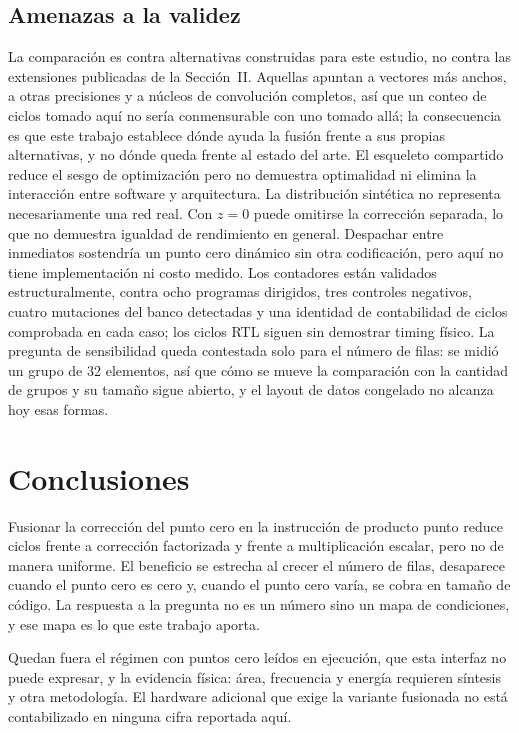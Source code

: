 \subsection{Amenazas a la validez}
La comparación es contra alternativas construidas para este estudio, no contra
las extensiones publicadas de la Sección~II. Aquellas apuntan a vectores más
anchos, a otras precisiones y a núcleos de convolución completos, así que un
conteo de ciclos tomado aquí no sería conmensurable con uno tomado allá; la
consecuencia es que este trabajo establece dónde ayuda la fusión frente a sus
propias alternativas, y no dónde queda frente al estado del arte. El esqueleto
compartido reduce el sesgo de optimización pero no demuestra optimalidad ni
elimina la interacción entre software y arquitectura. La
distribución sintética no representa necesariamente una red real. Con \(z{=}0\)
puede omitirse la corrección separada, lo que no demuestra igualdad de
rendimiento en general. Despachar entre inmediatos sostendría un punto cero
dinámico sin otra codificación, pero aquí no tiene implementación ni costo
medido. Los contadores están validados estructuralmente, contra ocho programas
dirigidos, tres controles negativos, cuatro mutaciones del banco detectadas y
una identidad de contabilidad de ciclos comprobada en cada caso; los ciclos RTL
siguen sin demostrar timing físico. La pregunta de sensibilidad queda contestada
solo para el número de filas: se midió un grupo de 32 elementos, así que cómo se
mueve la comparación con la cantidad de grupos y su tamaño sigue abierto, y el
layout de datos congelado no alcanza hoy esas formas.

\section{Conclusiones}
Fusionar la corrección del punto cero en la instrucción de producto punto reduce
ciclos frente a corrección factorizada y frente a multiplicación escalar, pero
no de manera uniforme. El beneficio se estrecha al crecer el número de filas,
desaparece cuando el punto cero es cero y, cuando el punto cero varía, se cobra
en tamaño de código. La respuesta a la pregunta no es un número sino
un mapa de condiciones, y ese mapa es lo que este trabajo aporta.

Quedan fuera el régimen con puntos cero leídos en ejecución, que esta interfaz
no puede expresar, y la evidencia física: área, frecuencia y energía requieren
síntesis y otra metodología. El hardware adicional que exige la variante
fusionada no está contabilizado en ninguna cifra reportada aquí.
